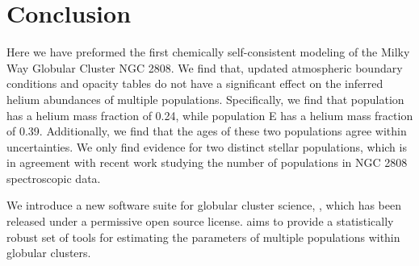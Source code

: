 \section{Conclusion}\label{sec:conclusion}
Here we have preformed the first chemically self-consistent modeling of the
Milky Way Globular Cluster NGC 2808. We find that, updated atmospheric boundary
conditions and opacity tables do not have a significant effect on the inferred
helium abundances of multiple populations. Specifically, we find that
population  has a helium mass fraction of 0.24, while population E has a helium
mass fraction of 0.39. Additionally, we find that the ages of these two populations 
agree within uncertainties. We only find evidence for two distinct stellar
populations, which is in agreement with recent work studying the number
of populations in NGC 2808 spectroscopic data.

We introduce a new software suite for globular cluster science,
\fidanka, which has been released under a permissive open source license.
\fidanka aims to provide a statistically robust set of tools for estimating the
parameters of multiple populations within globular clusters.
